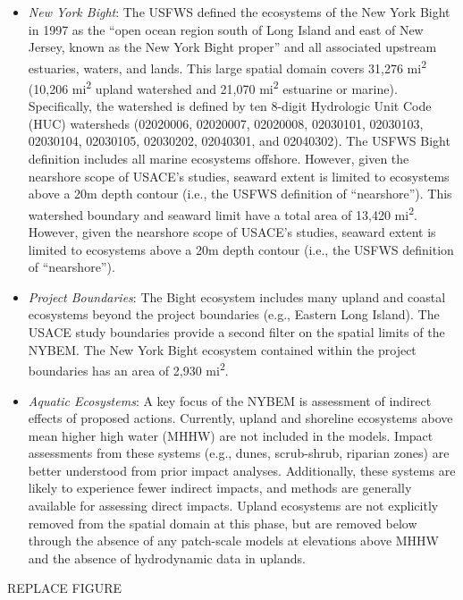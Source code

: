 \documentclass[
]{book}
\begin{document}
\begin{itemize}
\item
  \emph{New York Bight}: The USFWS defined the ecosystems of the New York Bight in 1997 as the ``open ocean region south of Long Island and east of New Jersey, known as the New York Bight proper'' and all associated upstream estuaries, waters, and lands. This large spatial domain covers 31,276 mi\textsuperscript{2} (10,206 mi\textsuperscript{2} upland watershed and 21,070 mi\textsuperscript{2} estuarine or marine). Specifically, the watershed is defined by ten 8-digit Hydrologic Unit Code (HUC) watersheds (02020006, 02020007, 02020008, 02030101, 02030103, 02030104, 02030105, 02030202, 02040301, and 02040302). The USFWS Bight definition includes all marine ecosystems offshore. However, given the nearshore scope of USACE's studies, seaward extent is limited to ecosystems above a 20m depth contour (i.e., the USFWS definition of ``nearshore''). This watershed boundary and seaward limit have a total area of 13,420 mi\textsuperscript{2}\citep{us_fish_and_wildlife_service_usfws_significant_1997}. However, given the nearshore scope of USACE's studies, seaward extent is limited to ecosystems above a 20m depth contour (i.e., the USFWS definition of ``nearshore'')\citep{us_fish_and_wildlife_service_usfws_significant_1997}.
\item
  \emph{Project Boundaries}: The Bight ecosystem includes many upland and coastal ecosystems beyond the project boundaries (e.g., Eastern Long Island). The USACE study boundaries provide a second filter on the spatial limits of the NYBEM. The New York Bight ecosystem contained within the project boundaries has an area of 2,930 mi\textsuperscript{2}.
\item
  \emph{Aquatic Ecosystems}: A key focus of the NYBEM is assessment of indirect effects of proposed actions. Currently, upland and shoreline ecosystems above mean higher high water (MHHW) are not included in the models. Impact assessments from these systems (e.g., dunes, scrub-shrub, riparian zones) are better understood from prior impact analyses. Additionally, these systems are likely to experience fewer indirect impacts, and methods are generally available for assessing direct impacts. Upland ecosystems are not explicitly removed from the spatial domain at this phase, but are removed below through the absence of any patch-scale models at elevations above MHHW and the absence of hydrodynamic data in uplands.
\end{itemize}

{REPLACE FIGURE}
\end{document}
